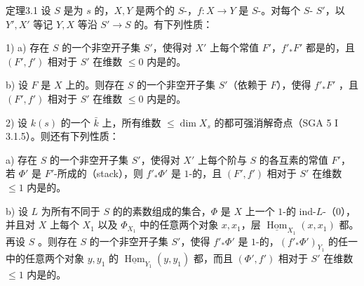\begin{SGAresult}{定理}{3.1}
设 $S$ 是为 $s$ 的，$X,Y$ 是两个的 $S$-，$f:X\to Y$ 是 $S$-。对每个 $S$- $S'$，以 $Y',X'$ 等记 $Y,X$ 等沿 $S'\to S$ 的。有下列性质：

1) a) 存在 $S$ 的一个非空开子集 $S'$，使得对 $X'$ 上每个常值 $F'$，$f'_*F'$ 都是的，且 $(F',f')$ 相对于 $S'$ 在维数 $\leq0$ 内是的。

b) 设 $F$ 是 $X$ 上的。则存在 $S$ 的一个非空开子集 $S'$（依赖于 $F$），使得 $f'_*F'$ ，且 $(F',f')$ 相对于 $S'$ 在维数 $\leq0$ 内是的。

2) 设 $k(s)$ 的一个 $\bar k$ 上，所有维数 $\leq\dim X_s$ 的都可强消解奇点（SGA 5 I 3.1.5）。则还有下列性质：

a) 存在 $S$ 的一个非空开子集 $S'$，使得对 $X'$ 上每个阶与 $S$ 的各互素的常值 $F'$，若 $\Phi'$ 是 $F'$-所成的（stack），则 $f'_*\Phi'$ 是 $1$-的，且 $(F',f')$ 相对于 $S'$ 在维数 $\leq1$ 内是的。

b) 设 $L$ 为所有不同于 $S$ 的的素数组成的集合，$\Phi$ 是 $X$ 上一个 $1$-的 ind-$L$-（0），并且对 $X$ 上每个 $X_1$ 以及 $\Phi_{X_1}$ 中的任意两个对象 $x,x_1$，层 $\underline{\operatorname{Hom}}_{X_1}(x,x_1)$ 都。再设 $S$ 。则存在 $S$ 的一个非空开子集 $S'$，使得 $f'_*\Phi'$ 是 $1$-的，$(f'_*\Phi')_{Y_1}$ 的任一中的任意两个对象 $y,y_1$ 的 $\underline{\operatorname{Hom}}_{Y_1}(y,y_1)$ 都，而且 $(\Phi',f')$ 相对于 $S'$ 在维数 $\leq1$ 内是的。
\end{SGAresult}
